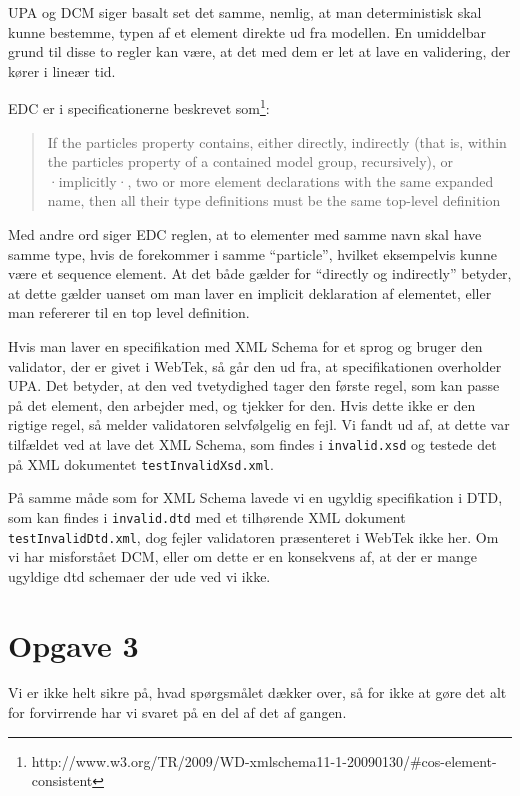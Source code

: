 \documentclass[a4paper,10pt]{article}
\begin{document}
UPA og DCM siger basalt set det samme, nemlig, at man deterministisk skal kunne bestemme, typen af et element direkte ud fra modellen. En umiddelbar grund til disse to regler kan være, at det med dem er let at lave en validering, der kører i lineær tid.

EDC er i specificationerne beskrevet som\footnote{http://www.w3.org/TR/2009/WD-xmlschema11-1-20090130/\#cos-element-consistent}:
\begin{quotation}
If the {particles} property contains, either directly, indirectly (that is, within the {particles} property of a contained model group, recursively), or ·implicitly·, two or more element declarations with the same expanded name, then all their type definitions must be the same top-level definition
\end{quotation}
Med andre ord siger EDC reglen, at to elementer med samme navn skal have samme type, hvis de forekommer i samme ``particle'', hvilket eksempelvis kunne være et sequence element. At det både gælder for ``directly og indirectly'' betyder, at dette gælder uanset om man laver en implicit deklaration af elementet, eller man refererer til en top level definition.

Hvis man laver en specifikation med XML Schema for et sprog og bruger den validator, der er givet i WebTek, så går den ud fra, at specifikationen overholder UPA. Det betyder, at den ved tvetydighed tager den første regel, som kan passe på det element, den arbejder med, og tjekker for den. Hvis dette ikke er den rigtige regel, så melder validatoren selvfølgelig en fejl. Vi fandt ud af, at dette var tilfældet ved at lave det XML Schema, som findes i \texttt{invalid.xsd} og testede det på XML dokumentet \texttt{testInvalidXsd.xml}.

På samme måde som for XML Schema lavede vi en ugyldig specifikation i DTD, som kan findes i \texttt{invalid.dtd} med et tilhørende XML dokument \texttt{testInvalidDtd.xml}, dog fejler validatoren præsenteret i WebTek ikke her. Om vi har misforstået DCM, eller om dette er en konsekvens af, at der er mange ugyldige dtd schemaer der ude ved vi ikke.

\section*{Opgave 3}
Vi er ikke helt sikre på, hvad spørgsmålet dækker over, så for ikke at gøre det alt for forvirrende har vi svaret på en del af det af gangen.
\end{document}
